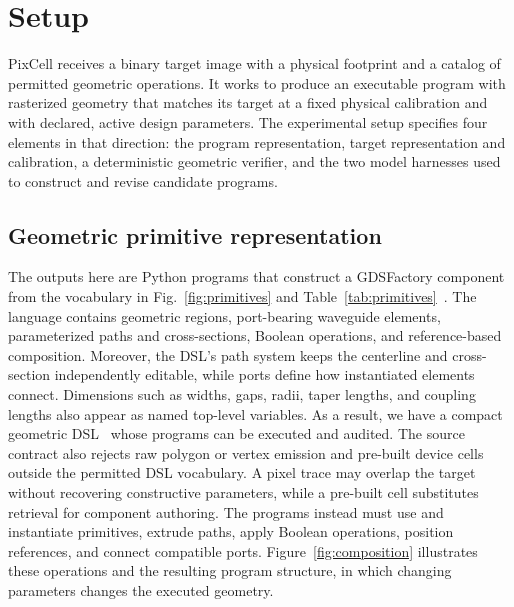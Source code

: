 \documentclass[%
 reprint,
 superscriptaddress,
 amsmath,amssymb,
 aps,
 pra,
 longbibliography,
 floatfix,
]{revtex4-2}
\begin{document}
\section{Setup}\label{sec:problem}

PixCell receives a binary target image with a physical footprint and a
catalog of permitted geometric operations. It works to produce an executable
program with rasterized geometry that matches its target at a fixed physical
calibration and with declared, active design parameters. The experimental
setup specifies four elements in that direction: the program representation,
target representation and calibration, a deterministic geometric verifier,
and the two model harnesses used to construct and revise candidate programs.

\begin{table}[!t]
\centering
\caption{\textbf{The PixCell geometric language.}
Permitted constructors and operators under GDSFactory 9.20.7.
Function-relevant dimensions must remain named and editable.}
\label{tab:primitives}

\end{table}

\subsection{Geometric primitive representation}\label{sec:representation}

The outputs here are Python programs that construct a GDSFactory component
from the vocabulary in Fig.~\ref{fig:primitives} and
Table~\ref{tab:primitives}~\cite{gdsfactory}. The language contains geometric
regions, port-bearing waveguide elements, parameterized paths and
cross-sections, Boolean operations, and reference-based composition.
Moreover, the DSL's path system keeps the centerline and cross-section
independently editable, while ports define how instantiated elements connect.
Dimensions such as widths, gaps, radii, taper lengths, and coupling lengths
also appear as named top-level variables. As a result, we have a compact
geometric DSL~\cite{chaudhuri} whose programs can be executed and audited.
The source contract also rejects raw polygon or vertex emission and pre-built
device cells outside the permitted DSL vocabulary. A pixel trace may overlap
the target without recovering constructive parameters, while a pre-built
cell substitutes retrieval for component authoring. The programs instead
must use and instantiate primitives, extrude paths, apply Boolean operations,
position references, and connect compatible ports.
Figure~\ref{fig:composition} illustrates these operations and the resulting
program structure, in which changing parameters changes the executed
geometry.
\end{document}
